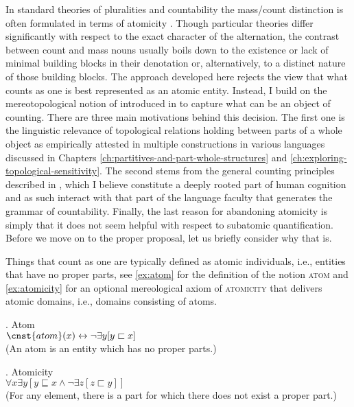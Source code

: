 	In standard theories of pluralities and countability the mass/count distinction is often formulated in terms of atomicity \citep[e.g.,][]{link1983logical,landman1991structures,landman2000events,chierchia1998plurality,chierchia2010mass}. Though particular theories differ significantly with respect to the exact character of the alternation, the contrast between count and mass nouns usually boils down to the existence or lack of minimal building blocks in their denotation or, alternatively, to a distinct nature of those building blocks. The approach developed here rejects the view that what counts as one is best represented as an atomic entity. Instead, I build on the mereotopological notion of  introduced in   to capture what can be an object of counting. There are three main motivations behind this decision. The first one is the linguistic relevance of topological relations holding between parts of a whole object as empirically attested in multiple constructions in various languages discussed in Chapters \ref{ch:partitives-and-part-whole-structures} and \ref{ch:exploring-topological-sensitivity}. The second stems from the general counting principles described in  , which I believe constitute a deeply rooted part of human cognition and as such interact with that part of the language faculty that generates the grammar of countability. Finally, the last reason for abandoning atomicity is simply that it does not seem helpful with respect to subatomic quantification. Before we move on to the proper proposal, let us briefly consider why that is.

	Things that count as one are typically defined as atomic individuals, i.e., entities that have no proper parts, see \ref{ex:atom} for the definition of the notion \textsc{atom} and \ref{ex:atomicity} for an optional mereological axiom of \textsc{atomicity} that delivers atomic domains, i.e., domains consisting of atoms.
	
	\ex. Atom\\
	$\cnst{atom}(x) \leftrightarrow \neg \exists y[y \sqsubset x]$\\
	(An atom is an entity which has no proper parts.)\label{ex:atom}
	
	\ex. Atomicity\\
	$\forall x \exists y[y \sqsubseteq x \wedge \neg \exists z[z \sqsubset y]]$\\
	(For any element, there is a part for which there does not exist a proper part.)\label{ex:atomicity}
	
